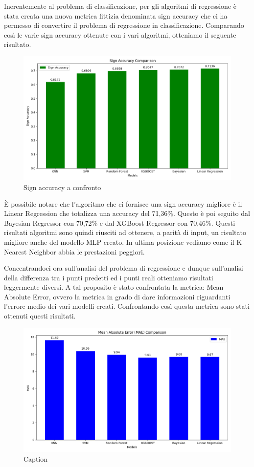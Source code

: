 Inerentemente al problema di classificazione, per gli algoritmi di regressione è stata creata una nuova metrica fittizia denominata sign accuracy che ci ha permesso di convertire il problema di regressione in classificazione.
Comparando così le varie sign accuracy ottenute con i vari algoritmi, otteniamo il seguente risultato.
\begin{figure}[H]
    \centering
    \includegraphics[width=0.7\linewidth]{img/sign_accuracy.png}
    \caption{Sign accuracy a confronto}
    \label{fig:enter-label}
\end{figure}

È possibile notare che l'algoritmo che ci fornisce una sign accuracy migliore è il Linear Regression che totalizza una accuracy del 71,36\%. Questo è poi seguito dal Bayesian Regressor con 70,72\% e dal XGBoost Regressor con 70,46\%.
Questi risultati algoritmi sono quindi riusciti ad ottenere, a parità di input, un risultato migliore anche del modello MLP creato.
In ultima posizione vediamo come il K-Nearest Neighbor abbia le prestazioni peggiori. 
\newline

Concentrandoci ora sull'analisi del problema di regressione e dunque sull'analisi della differenza tra i punti predetti ed i punti reali otteniamo risultati leggermente diversi.
A tal proposito è stato confrontata la metrica: Mean Absolute Error, ovvero la metrica in grado di dare informazioni riguardanti l'errore medio dei vari modelli creati.
Confrontando così questa metrica sono stati ottenuti questi risultati.
\begin{figure}[H]
    \centering
    \includegraphics[width=0.7\linewidth]{img/mae_a_confronto.png}
    \caption{Caption}
    \label{fig:enter-label}
\end{figure}

